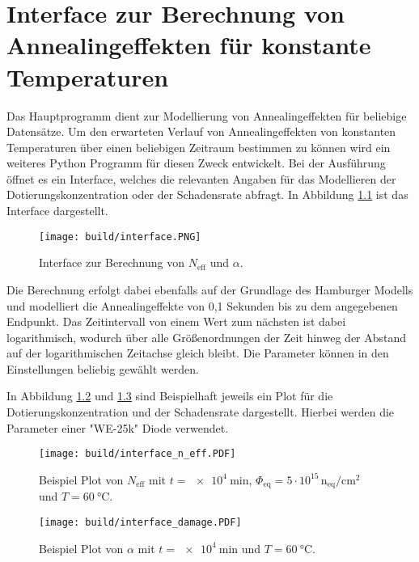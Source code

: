 \chapter{Interface zur Berechnung von Annealingeffekten für konstante Temperaturen}
Das Hauptprogramm dient zur Modellierung von Annealingeffekten für beliebige Datensätze.
Um den erwarteten Verlauf von Annealingeffekten von konstanten Temperaturen über einen
beliebigen Zeitraum bestimmen zu können wird ein weiteres Python Programm für diesen Zweck entwickelt.
Bei der Ausführung öffnet es ein Interface, welches die relevanten Angaben für
das Modellieren der Dotierungskonzentration oder der Schadensrate abfragt. In Abbildung \ref{fig:interface}
ist das Interface dargestellt.

\begin{figure}
  \centering
    \texttt{[image: build/interface.PNG]}
\caption{Interface zur Berechnung von $N_{\mathrm{eff}}$ und $\alpha$.}
\label{fig:interface}
\end{figure}

Die Berechnung erfolgt dabei ebenfalls auf der Grundlage des Hamburger Modells und modelliert die
Annealingeffekte von
0,1 Sekunden bis zu dem angegebenen Endpunkt.
Das Zeitintervall von einem Wert zum nächsten ist dabei logarithmisch, wodurch über alle
Größenordnungen der Zeit hinweg der Abstand auf der logarithmischen Zeitachse gleich bleibt.
Die Parameter können in den Einstellungen beliebig gewählt werden.

In Abbildung \ref{fig:inter_n} und \ref{fig:inter_damage} sind Beispielhaft jeweils ein Plot für die Dotierungskonzentration und der
Schadensrate dargestellt. Hierbei werden die Parameter einer "WE-25k" Diode verwendet.


\begin{figure}
  \centering
  \texttt{[image: build/interface\_n\_eff.PDF]}
  \caption{Beispiel Plot von $N_{\mathrm{eff}}$ mit $t = \SI{e4}{\minute}$, $\Phi_{\mathrm{eq}}= 5\cdot 10^{15} \, \mathrm{n_{eq}/cm^2}$ und $T=\SI{60}{\celsius}$.}
  \label{fig:inter_n}
\end{figure}

\begin{figure}
  \centering
  \texttt{[image: build/interface\_damage.PDF]}
  \caption{Beispiel Plot von $\alpha$ mit $t = \SI{e4}{\minute}$ und $T=\SI{60}{\celsius}$.}
  \label{fig:inter_damage}
\end{figure}
